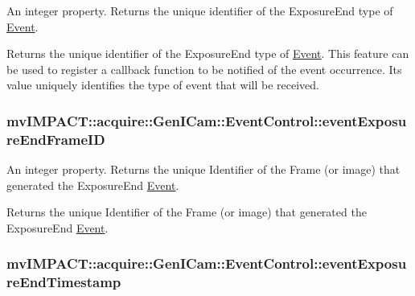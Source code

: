 An integer property. Returns the unique identifier of the Exposure\+End type of \hyperlink{classmv_i_m_p_a_c_t_1_1acquire_1_1_event}{Event}. 

Returns the unique identifier of the Exposure\+End type of \hyperlink{classmv_i_m_p_a_c_t_1_1acquire_1_1_event}{Event}. This feature can be used to register a callback function to be notified of the event occurrence. Its value uniquely identifies the type of event that will be received. \hypertarget{classmv_i_m_p_a_c_t_1_1acquire_1_1_gen_i_cam_1_1_event_control_aa2b82bf02578df929011c23843238dcc}{
\subsubsection[{event\+Exposure\+End\+Frame\+I\+D}]{ mv\+I\+M\+P\+A\+C\+T\+::acquire\+::\+Gen\+I\+Cam\+::\+Event\+Control\+::event\+Exposure\+End\+Frame\+I\+D}}\label{classmv_i_m_p_a_c_t_1_1acquire_1_1_gen_i_cam_1_1_event_control_aa2b82bf02578df929011c23843238dcc}


An integer property. Returns the unique Identifier of the Frame (or image) that generated the Exposure\+End \hyperlink{classmv_i_m_p_a_c_t_1_1acquire_1_1_event}{Event}. 

Returns the unique Identifier of the Frame (or image) that generated the Exposure\+End \hyperlink{classmv_i_m_p_a_c_t_1_1acquire_1_1_event}{Event}. \hypertarget{classmv_i_m_p_a_c_t_1_1acquire_1_1_gen_i_cam_1_1_event_control_a90f0f5d64ac0c6ef70a4e2a8e1e7681b}{
\subsubsection[{event\+Exposure\+End\+Timestamp}]{ mv\+I\+M\+P\+A\+C\+T\+::acquire\+::\+Gen\+I\+Cam\+::\+Event\+Control\+::event\+Exposure\+End\+Timestamp}}\label{classmv_i_m_p_a_c_t_1_1acquire_1_1_gen_i_cam_1_1_event_control_a90f0f5d64ac0c6ef70a4e2a8e1e7681b}


